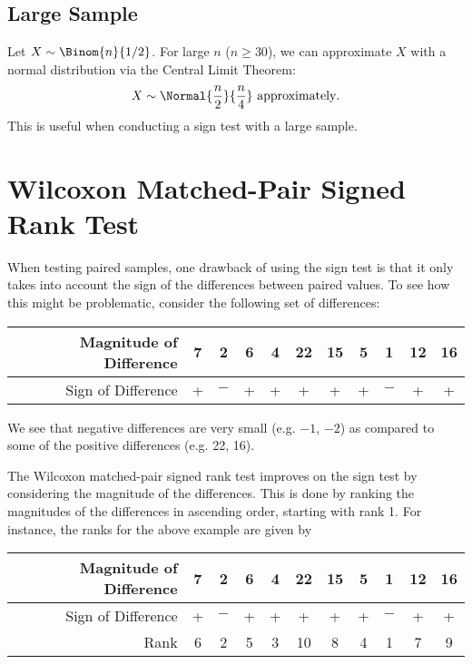 \subsection{Large Sample}

Let $X \sim \Binom{n}{1/2}$. For large $n$ ($n \geq 30$), we can approximate $X$ with a normal distribution via the Central Limit Theorem: \[X \sim \Normal{\frac{n}{2}}{\frac{n}{4}} \text{ approximately}.\] This is useful when conducting a sign test with a large sample.

\section{Wilcoxon Matched-Pair Signed Rank Test}

When testing paired samples, one drawback of using the sign test is that it only takes into account the sign of the differences between paired values. To see how this might be problematic, consider the following set of differences:

\begin{table}[H]
    \centering
    \begin{tabular}{|r|c|c|c|c|c|c|c|c|c|c|}
        \hline
        Magnitude of Difference & 7 & 2 & 6 & 4 & 22 & 15 & 5 & 1 & 12 & 16 \\ \hline
        Sign of Difference & + & $-$ & + & + & + & + & + & $-$ & + & + \\ \hline
    \end{tabular}
\end{table}

We see that negative differences are very small (e.g. $-1$, $-2$) as compared to some of the positive differences (e.g. 22, 16).

The Wilcoxon matched-pair signed rank test improves on the sign test by considering the magnitude of the differences. This is done by ranking the magnitudes of the differences in ascending order, starting with rank 1. For instance, the ranks for the above example are given by

\begin{table}[H]
    \centering
    \begin{tabular}{|r|c|c|c|c|c|c|c|c|c|c|}
        \hline
        Magnitude of Difference & 7 & 2 & 6 & 4 & 22 & 15 & 5 & 1 & 12 & 16 \\ \hline
        Sign of Difference & + & $-$ & + & + & + & + & + & $-$ & + & + \\ \hline
        Rank & 6 & 2 & 5 & 3 & 10 & 8 & 4 & 1 & 7 & 9 \\ \hline
    \end{tabular}
\end{table}


